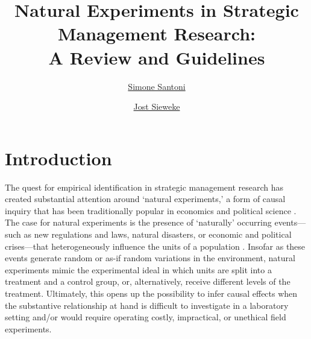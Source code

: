 \documentclass[11pt, english]{article}
\title{Natural Experiments in Strategic Management Research:\\
       A Review and Guidelines}
\author[1]{\href{simone.santoni.1@city.ac.uk}{Simone Santoni}}
\author[2]{\href{j.sieweke@vu.nl}{Jost Sieweke}}
\affil[1]{Cass Business School --- City, University of London}
\affil[2]{Vrije Universiteit Amsterdam}
\begin{document}
\begin{singlespace}
  
\maketitle

%
%
%
%

\end{singlespace}

\clearpage


\section{Introduction}
\label{sec:introduction}


\noindent The quest for empirical identification in strategic management
research has created substantial attention around `natural experiments,' a form
of causal inquiry that has been traditionally popular in economics
\parencite[][]{Meyer1995,Rosenzweig2000} and political science
\parencite[][]{Dunning2008}.  The case for natural experiments is the presence
of `naturally' occurring events---such as new regulations and laws, natural
disasters, or economic and political crises---that heterogeneously influence
the units of a population \parencite[][]{Dunning2012,Robinson2009}. Insofar as
these events generate random or as-if random variations in the environment,
natural experiments mimic the experimental ideal in which units are split into a
treatment and a control group, or, alternatively, receive different levels of
the treatment. Ultimately, this opens up the possibility to infer causal effects
when the substantive relationship at hand is difficult to investigate in a
laboratory setting and/or would require operating costly, impractical, or
unethical field experiments.

\end{document}
